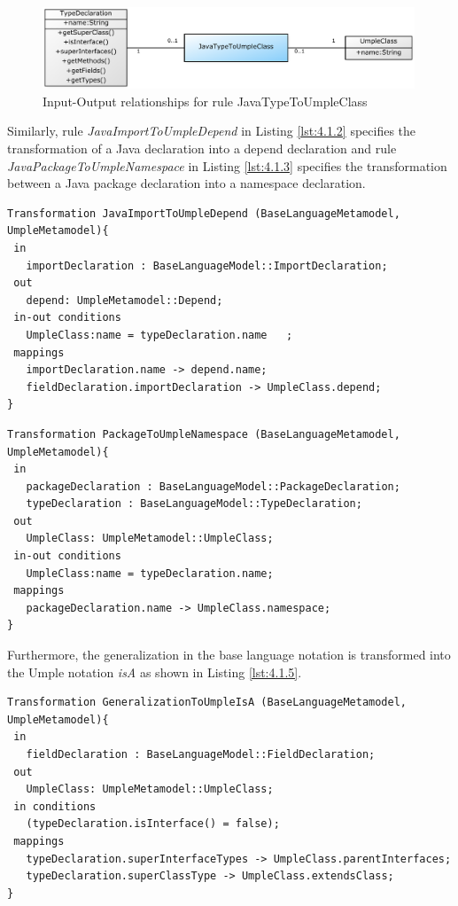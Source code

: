 \begin{figure}[h]
\centering
\includegraphics[width=0.99\textwidth]{Figures/ch4InitialMapping.pdf}
\caption{Input-Output relationships for rule JavaTypeToUmpleClass}
\label{fig:4.1.1}
\end{figure}

Similarly, rule  \textit{JavaImportToUmpleDepend} in Listing \ref{lst:4.1.2} specifies the transformation of a Java declaration into a depend declaration and rule \textit{JavaPackageToUmpleNamespace} in Listing \ref{lst:4.1.3} specifies the transformation between a Java package declaration into a namespace declaration.

\begin{lstlisting}[style=mine,caption=Rule JavaImportToUmpleDepend,label=lst:4.1.2]
Transformation JavaImportToUmpleDepend (BaseLanguageMetamodel, UmpleMetamodel){ 
 in
   importDeclaration : BaseLanguageModel::ImportDeclaration;
 out
   depend: UmpleMetamodel::Depend;
 in-out conditions
   UmpleClass:name = typeDeclaration.name	;
 mappings
   importDeclaration.name -> depend.name;
   fieldDeclaration.importDeclaration -> UmpleClass.depend;
}
\end{lstlisting}

\begin{lstlisting}[style=mine,caption=Rule PackageToUmpleNamespace,label=lst:4.1.3]
Transformation PackageToUmpleNamespace (BaseLanguageMetamodel, UmpleMetamodel){ 
 in
   packageDeclaration : BaseLanguageModel::PackageDeclaration;
   typeDeclaration : BaseLanguageModel::TypeDeclaration;
 out
   UmpleClass: UmpleMetamodel::UmpleClass;
 in-out conditions
   UmpleClass:name = typeDeclaration.name;
 mappings
   packageDeclaration.name -> UmpleClass.namespace;
}
\end{lstlisting}

Furthermore, the generalization in the base language notation is transformed into the Umple notation \textit{isA} as shown in Listing \ref{lst:4.1.5}.

\begin{lstlisting}[style=mine,caption=Rule GeneralizationToUmpleIsA,label=lst:4.1.5]
Transformation GeneralizationToUmpleIsA (BaseLanguageMetamodel, UmpleMetamodel){ 
 in
   fieldDeclaration : BaseLanguageModel::FieldDeclaration;
 out
   UmpleClass: UmpleMetamodel::UmpleClass;
 in conditions
   (typeDeclaration.isInterface() = false);
 mappings
   typeDeclaration.superInterfaceTypes -> UmpleClass.parentInterfaces;
   typeDeclaration.superClassType -> UmpleClass.extendsClass;
}
\end{lstlisting}

